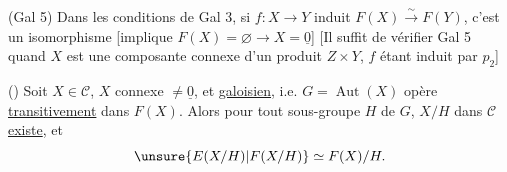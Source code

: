 
(Gal 5) Dans les conditions de Gal 3, si  $f:X\to Y$ induit $F(X)\overset{\sim}{\longrightarrow}F(Y)$, c'est un isomorphisme
[implique $F(X)=\varnothing\longrightarrow X=\underline0$]
[Il suffit de vérifier Gal 5 quand $X$ est une composante connexe d'un produit $Z\times Y$, $f$ étant induit par $p_2$]

() Soit $X\in\mathcal C$, $X$ connexe $\ne\underline0$, et \uline{galoisien},  i.e.  $G=\operatorname{Aut}(X)$ opère \uline{transitivement} dans $F(X)$.
Alors pour tout sous-groupe $H$ de $G$, $X/H$ dans $\mathcal C$ \uline{existe}, et
\[
\unsure{E(X/H)|F(X/H)}\simeq F(X)/H.
\]

